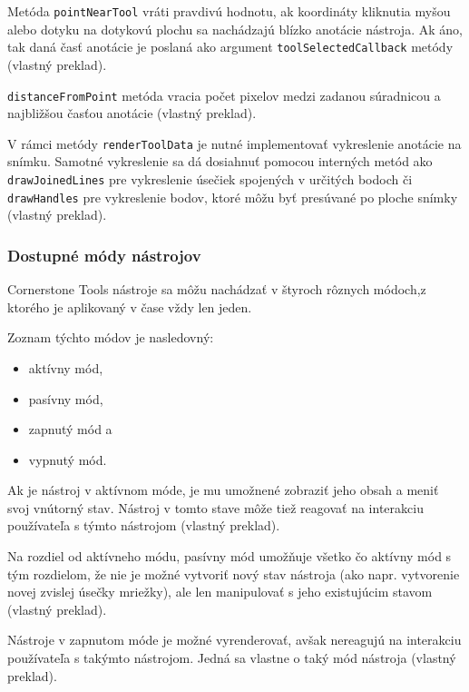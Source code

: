 Metóda \texttt{pointNearTool} vráti pravdivú hodnotu, ak koordináty kliknutia myšou alebo dotyku na dotykovú plochu sa nachádzajú blízko anotácie nástroja. Ak áno, tak daná časť anotácie je poslaná ako argument \texttt{toolSelectedCallback} metódy \cite{base_tool_description} (vlastný preklad).

\texttt{distanceFromPoint} metóda vracia počet pixelov medzi zadanou súradnicou a najbližšou časťou anotácie \cite{base_tool_description} (vlastný preklad).

V rámci metódy \texttt{renderToolData} je nutné implementovať vykreslenie anotácie na snímku. Samotné vykreslenie sa dá dosiahnuť pomocou interných metód ako \texttt{drawJoinedLines} pre vykreslenie úsečiek spojených v určitých bodoch či \texttt{drawHandles} pre vykreslenie bodov, ktoré môžu byť presúvané po ploche snímky \cite{base_tool_description} (vlastný preklad).

\clearpage

\subsubsection {Dostupné módy nástrojov}
Cornerstone Tools nástroje sa môžu nachádzať v štyroch rôznych módoch,\newline z ktorého je aplikovaný v čase vždy len jeden.

Zoznam týchto módov je nasledovný:
\begin {itemize}
\item {aktívny mód,}
\item {pasívny mód,}
\item {zapnutý mód a}
\item {vypnutý mód.}
\end {itemize}

Ak je nástroj v aktívnom móde, je mu umožnené zobraziť jeho obsah a meniť svoj vnútorný stav. Nástroj v tomto stave môže tiež reagovať na interakciu používateľa s týmto nástrojom \cite{cornerstone_tools_modes} (vlastný preklad).

Na rozdiel od aktívneho módu, pasívny mód umožňuje všetko čo aktívny mód s tým rozdielom, že nie je možné vytvoriť nový stav nástroja (ako napr. vytvorenie novej zvislej úsečky mriežky), ale len manipulovať s jeho existujúcim stavom \cite{cornerstone_tools_modes} (vlastný preklad).

Nástroje v zapnutom móde je možné vyrenderovať, avšak nereagujú na interakciu používateľa s takýmto nástrojom. Jedná sa vlastne o taký  mód nástroja \cite{cornerstone_tools_modes} (vlastný preklad).

